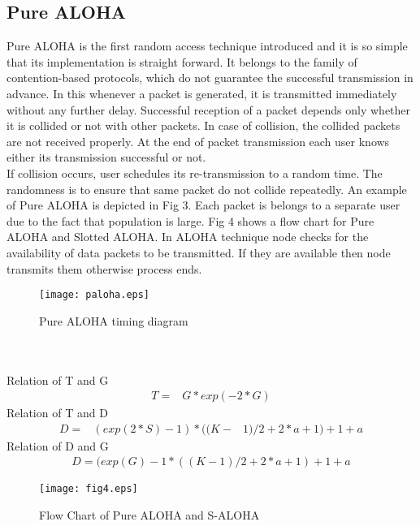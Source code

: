 \documentclass[11pt, conference, compsocconf, onecolumn]{IEEEtran}
\begin{document}
\subsection{Pure ALOHA}
Pure ALOHA is the first random access technique introduced and it is so simple that its implementation is straight forward. It belongs to the family of contention-based protocols, which do not guarantee the successful transmission in advance. In this whenever a packet is generated, it is transmitted immediately without any further delay. Successful reception of a packet depends only whether it is collided or not with other packets. In case of collision, the collided packets are not received properly. At the end of packet transmission each user knows either its transmission successful or not.
\\
\indent If collision occurs, user schedules its re-transmission to a random time. The randomness is to ensure that same packet do not collide repeatedly. An example of Pure ALOHA is depicted in Fig 3. Each packet is belongs to a separate user due to the fact that population is large.
Fig 4 shows a flow chart for Pure ALOHA and Slotted ALOHA. In ALOHA technique node checks for the availability of data packets to be transmitted.
If they are available then node transmits them otherwise process ends.
\begin{figure}[!h]
\centering
\caption{Pure ALOHA timing diagram}
\texttt{[image: paloha.eps]}
\end{figure}
\\\\
Relation of T and G
\begin{eqnarray}
T=&G*exp(-2*G)
\end{eqnarray}
Relation of T and D
\begin{eqnarray}
D=&(exp(2*S)-1)*((K-&1)/2+2*a+1)+1+a
\end{eqnarray}
Relation of D and G
\begin{eqnarray}
D=(exp(G)-1*((K-1)/2+2*a+1)+1+a
\end{eqnarray}
\begin{figure}[!h]
\centering
\caption{Flow Chart of Pure ALOHA and S-ALOHA}
\texttt{[image: fig4.eps]}
\end{figure}
\end{document}
